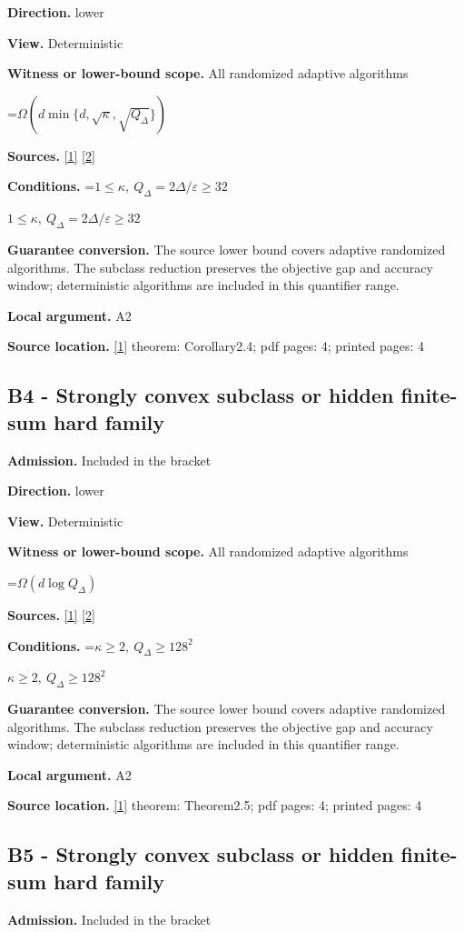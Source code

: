 \documentclass[10pt,a4paper]{article}
\newcommand{\AtlasMath}[1]{\par\begingroup\centering\setbox0=\hbox{$\displaystyle #1$}\ifdim\wd0>1.4\linewidth\typeout{ATLAS WIDE FORMULA: \the\wd0}\fi\ifdim\wd0>\linewidth\resizebox{\linewidth}{!}{\box0}\else\box0\fi\par\endgroup}
\newcommand{\AtlasInlineMath}[1]{\begingroup\setbox0=\hbox{$#1$}\ifdim\wd0>.4\linewidth\endgroup\AtlasMath{#1}\else\endgroup$#1$\fi}
\begin{document}
\textbf{Direction.} lower

\textbf{View.} Deterministic

\textbf{Witness or lower-bound scope.} All randomized adaptive algorithms

\AtlasMath{\Omega(d\min\{d,\sqrt\kappa,\sqrt{Q_\Delta}\})}
\textbf{Sources.} \href{https://arxiv.org/html/2610.00345v1}{[1]} \href{https://arxiv.org/html/2609.00045v3}{[2]}

\textbf{Conditions.} \AtlasInlineMath{1\le\kappa,\ Q_\Delta=2\Delta/\varepsilon\ge32}

\textbf{Guarantee conversion.} The source lower bound covers adaptive randomized algorithms. The subclass reduction preserves the objective gap and accuracy window; deterministic algorithms are included in this quantifier range.

\textbf{Local argument.} A2

\textbf{Source location.} \href{https://arxiv.org/html/2610.00345v1}{[1]} theorem: Corollary2.4; pdf pages: 4; printed pages: 4

\subsection{B4 - Strongly convex subclass or hidden finite-sum hard family}
\textbf{Admission.} Included in the bracket

\textbf{Direction.} lower

\textbf{View.} Deterministic

\textbf{Witness or lower-bound scope.} All randomized adaptive algorithms

\AtlasMath{\Omega(d\log Q_\Delta)}
\textbf{Sources.} \href{https://arxiv.org/html/2610.00345v1}{[1]} \href{https://arxiv.org/html/2609.00045v3}{[2]}

\textbf{Conditions.} \AtlasInlineMath{\kappa\ge2,\ Q_\Delta\ge128^2}

\textbf{Guarantee conversion.} The source lower bound covers adaptive randomized algorithms. The subclass reduction preserves the objective gap and accuracy window; deterministic algorithms are included in this quantifier range.

\textbf{Local argument.} A2

\textbf{Source location.} \href{https://arxiv.org/html/2610.00345v1}{[1]} theorem: Theorem2.5; pdf pages: 4; printed pages: 4

\subsection{B5 - Strongly convex subclass or hidden finite-sum hard family}
\textbf{Admission.} Included in the bracket
\end{document}

